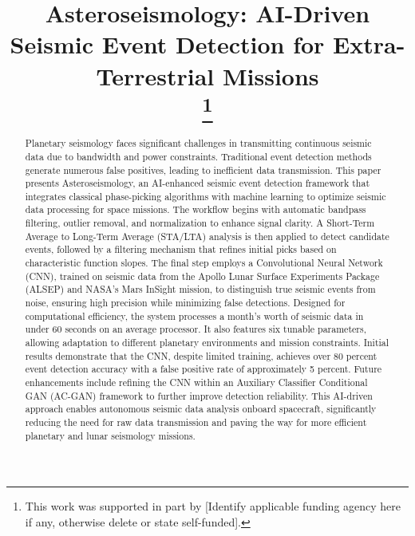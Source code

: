 \documentclass[conference]{IEEEtran}
\begin{document}
\title{Asteroseismology: AI-Driven Seismic Event Detection for Extra-Terrestrial Missions\\
\thanks{This work was supported in part by [Identify applicable funding agency here if any, otherwise delete or state self-funded].}
}

\author{
\and
{}
}

\maketitle

\begin{abstract}
    Planetary seismology faces significant challenges in transmitting continuous seismic data
    due to bandwidth and power constraints. Traditional event detection methods generate
    numerous false positives, leading to inefficient data transmission. This paper presents
    Asteroseismology, an AI-enhanced seismic event detection framework that integrates
    classical phase-picking algorithms with machine learning to optimize seismic data
    processing for space missions. The workflow begins with automatic bandpass filtering,
    outlier removal, and normalization to enhance signal clarity. A Short-Term Average to
    Long-Term Average (STA/LTA) analysis is then applied to detect candidate events, followed
    by a filtering mechanism that refines initial picks based on characteristic function
    slopes. The final step employs a Convolutional Neural Network (CNN), trained on seismic
    data from the Apollo Lunar Surface Experiments Package (ALSEP) and NASA’s Mars InSight
    mission, to distinguish true seismic events from noise, ensuring high precision while
    minimizing false detections. Designed for computational efficiency, the system
    processes a month’s worth of seismic data in under 60 seconds on an average processor.
    It also features six tunable parameters, allowing adaptation to different planetary
    environments and mission constraints. Initial results demonstrate that the CNN, despite
    limited training, achieves over 80 percent event detection accuracy with a false
    positive rate of approximately 5 percent. Future enhancements include refining the
    CNN within an Auxiliary Classifier Conditional GAN (AC-GAN) framework to further
    improve detection reliability. This AI-driven approach enables autonomous seismic
    data analysis onboard spacecraft, significantly reducing the need for raw data
    transmission and paving the way for more efficient planetary and lunar seismology
    missions.
\end{abstract}
\end{document}
